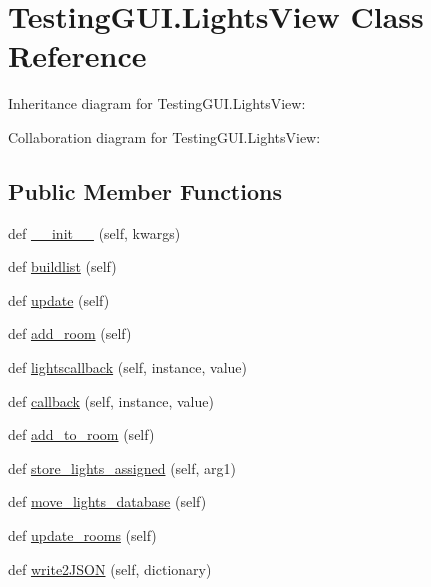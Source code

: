 \hypertarget{classTestingGUI_1_1LightsView}{}\section{Testing\+G\+U\+I.\+Lights\+View Class Reference}
\label{classTestingGUI_1_1LightsView}


Inheritance diagram for Testing\+G\+U\+I.\+Lights\+View\+:


Collaboration diagram for Testing\+G\+U\+I.\+Lights\+View\+:
\subsection*{Public Member Functions}
\begin{DoxyCompactItemize}
\item 
def \hyperlink{classTestingGUI_1_1LightsView_ae63565dfb2328abb68fa8751284425a9}{\+\_\+\+\_\+init\+\_\+\+\_\+} (self, kwargs)
\item 
def \hyperlink{classTestingGUI_1_1LightsView_ad567fc119c87bdf050d2d105cffb102e}{buildlist} (self)
\item 
def \hyperlink{classTestingGUI_1_1LightsView_ae28189742abd26346c227385fe8866c7}{update} (self)
\item 
def \hyperlink{classTestingGUI_1_1LightsView_ab04e59790bba8440f9f1d65e84bc8ae6}{add\+\_\+room} (self)
\item 
def \hyperlink{classTestingGUI_1_1LightsView_abc44bd1d87c0d060890ad095b6195d27}{lightscallback} (self, instance, value)
\item 
def \hyperlink{classTestingGUI_1_1LightsView_a6868b6f77d43e03f6568b62169c9b19c}{callback} (self, instance, value)
\item 
def \hyperlink{classTestingGUI_1_1LightsView_a38460cbc7553198ef9a613d09919e077}{add\+\_\+to\+\_\+room} (self)
\item 
def \hyperlink{classTestingGUI_1_1LightsView_a3ff5b4674219060370bd91c84e99513c}{store\+\_\+lights\+\_\+assigned} (self, arg1)
\item 
def \hyperlink{classTestingGUI_1_1LightsView_ad2a97175fc114e694c6fe598361c6334}{move\+\_\+lights\+\_\+database} (self)
\item 
def \hyperlink{classTestingGUI_1_1LightsView_add6c257a4625658791c08aca275dbe4d}{update\+\_\+rooms} (self)
\item 
def \hyperlink{classTestingGUI_1_1LightsView_a363b48af2153effb586500f5ca0f371d}{write2\+J\+S\+ON} (self, dictionary)

\end{DoxyCompactItemize}
